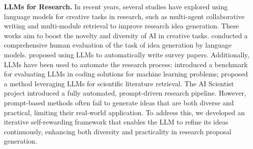 \documentclass{article} %
\begin{document}


\textbf{LLMs for Research.} In recent years, several studies have explored using language models for creative tasks in research, such as multi-agent collaborative writing \citep{baek2024researchagent} and multi-module retrieval \citep{yang2023large} to improve research idea generation. These works aim to boost the novelty and diversity of AI in creative tasks. \citet{si2024can} conducted a comprehensive human evaluation of the task of idea generation by language models. \citet{wang2024autosurvey} proposed using LLMs to automatically write survey papers. Additionally, LLMs have been used to automate the research process: \citet{huang2024mlagentbench} introduced a benchmark for evaluating LLMs in coding solutions for machine learning problems; \citet{wang2023scimon} proposed a method leveraging LLMs for scientific literature retrieval. The AI Scientist project \citep{lu2024ai} introduced a fully automated, prompt-driven research pipeline. However, prompt-based methods often fail to generate ideas that are both diverse and practical, limiting their real-world application. To address this, we developed an iterative self-rewarding framework that enables the LLM to refine its ideas continuously, enhancing both diversity and practicality in research proposal generation.
\end{document}
